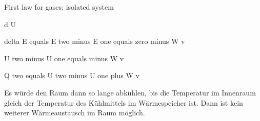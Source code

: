First law for gases; isolated system

d U

delta E equals E two minus E one equals zero minus W v

U two minus U one equals minus W v

Q two equals U two minus U one plus W v

Es würde den Raum dann so lange abkühlen, bis die Temperatur im Innenraum gleich der Temperatur des Kühlmittels im Wärmespeicher ist. Dann ist kein weiterer Wärmeaustausch im Raum möglich.